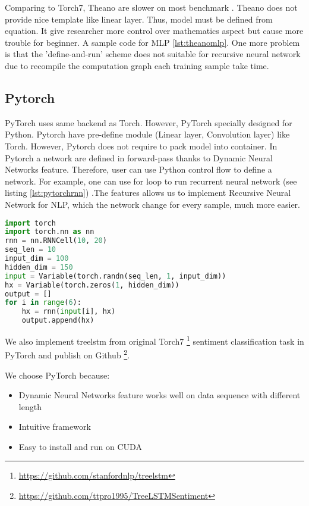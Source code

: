 Comparing to Torch7, Theano are slower on most benchmark \cite{collobert2011torch7}. Theano does not provide nice template like linear layer. Thus, model must be defined from equation. It give researcher more control over mathematics aspect but cause more trouble for beginner. A sample code for MLP \ref{lst:theanomlp}. One more problem is that the 'define-and-run' scheme does not suitable for recursive neural network due to recompile the computation graph each training sample take time. 

\subsection{Pytorch}
PyTorch uses same backend as Torch. However, PyTorch specially designed for Python. Pytorch have pre-define module (Linear layer, Convolution layer) like Torch. However, Pytorch does not require to pack model into container. In Pytorch a network are defined in forward-pass thanks to Dynamic Neural Networks feature. Therefore, user can use Python control flow to define a network. For example, one can use for loop to run recurrent neural network (see listing \ref{lst:pytorchrnn}) .The features allows us to implement Recursive Neural Network for NLP, which the network change for every sample, much more easier. 

\begin{lstlisting}[caption={RNN},label={lst:pytorchrnn}, language={python}]
import torch
import torch.nn as nn
rnn = nn.RNNCell(10, 20)
seq_len = 10
input_dim = 100
hidden_dim = 150
input = Variable(torch.randn(seq_len, 1, input_dim))
hx = Variable(torch.zeros(1, hidden_dim))
output = []
for i in range(6):
    hx = rnn(input[i], hx)
    output.append(hx)
\end{lstlisting}

We also implement treelstm from original Torch7 \footnote{\url{https://github.com/stanfordnlp/treelstm}} sentiment classification task in PyTorch and publish on Github \footnote{\url{https://github.com/ttpro1995/TreeLSTMSentiment}}.   

We choose PyTorch because: 
\begin{itemize}
	\item Dynamic Neural Networks feature works well on data sequence with different length
	\item Intuitive framework
	\item Easy to install and run on CUDA
\end{itemize}



